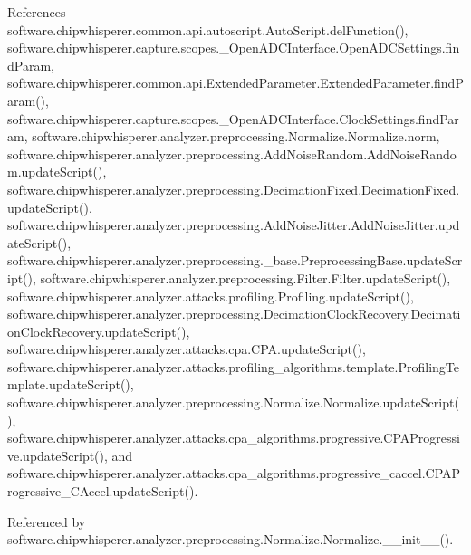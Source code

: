 References software.\+chipwhisperer.\+common.\+api.\+autoscript.\+Auto\+Script.\+del\+Function(), software.\+chipwhisperer.\+capture.\+scopes.\+\_\+\+Open\+A\+D\+C\+Interface.\+Open\+A\+D\+C\+Settings.\+find\+Param, software.\+chipwhisperer.\+common.\+api.\+Extended\+Parameter.\+Extended\+Parameter.\+find\+Param(), software.\+chipwhisperer.\+capture.\+scopes.\+\_\+\+Open\+A\+D\+C\+Interface.\+Clock\+Settings.\+find\+Param, software.\+chipwhisperer.\+analyzer.\+preprocessing.\+Normalize.\+Normalize.\+norm, software.\+chipwhisperer.\+analyzer.\+preprocessing.\+Add\+Noise\+Random.\+Add\+Noise\+Random.\+update\+Script(), software.\+chipwhisperer.\+analyzer.\+preprocessing.\+Decimation\+Fixed.\+Decimation\+Fixed.\+update\+Script(), software.\+chipwhisperer.\+analyzer.\+preprocessing.\+Add\+Noise\+Jitter.\+Add\+Noise\+Jitter.\+update\+Script(), software.\+chipwhisperer.\+analyzer.\+preprocessing.\+\_\+base.\+Preprocessing\+Base.\+update\+Script(), software.\+chipwhisperer.\+analyzer.\+preprocessing.\+Filter.\+Filter.\+update\+Script(), software.\+chipwhisperer.\+analyzer.\+attacks.\+profiling.\+Profiling.\+update\+Script(), software.\+chipwhisperer.\+analyzer.\+preprocessing.\+Decimation\+Clock\+Recovery.\+Decimation\+Clock\+Recovery.\+update\+Script(), software.\+chipwhisperer.\+analyzer.\+attacks.\+cpa.\+C\+P\+A.\+update\+Script(), software.\+chipwhisperer.\+analyzer.\+attacks.\+profiling\+\_\+algorithms.\+template.\+Profiling\+Template.\+update\+Script(), software.\+chipwhisperer.\+analyzer.\+preprocessing.\+Normalize.\+Normalize.\+update\+Script(), software.\+chipwhisperer.\+analyzer.\+attacks.\+cpa\+\_\+algorithms.\+progressive.\+C\+P\+A\+Progressive.\+update\+Script(), and software.\+chipwhisperer.\+analyzer.\+attacks.\+cpa\+\_\+algorithms.\+progressive\+\_\+caccel.\+C\+P\+A\+Progressive\+\_\+\+C\+Accel.\+update\+Script().



Referenced by software.\+chipwhisperer.\+analyzer.\+preprocessing.\+Normalize.\+Normalize.\+\_\+\+\_\+init\+\_\+\+\_\+().


